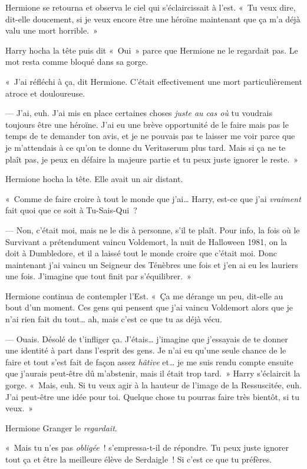 Hermione se retourna et observa le ciel qui s'éclaircissait à l'est. «~Tu veux dire, dit-elle doucement, si je veux encore être une héroïne maintenant que ça m'a déjà valu une mort horrible.~»

Harry hocha la tête puis dit «~Oui~» parce que Hermione ne le regardait pas. Le mot resta comme bloqué dans sa gorge.

«~J'ai réfléchi à ça, dit Hermione. C'était effectivement une mort particulièrement atroce et douloureuse.

--- J'ai, euh. J'ai mis en place certaines choses \emph{juste au cas où} tu voudrais toujours être une héroïne. J'ai eu une brève opportunité de le faire mais pas le temps de te demander ton avis, et je ne pouvais pas te laisser me voir parce que je m'attendais à ce qu'on te donne du Veritaserum plus tard. Mais si ça ne te plaît pas, je peux en défaire la majeure partie et tu peux juste ignorer le reste.~»

Hermione hocha la tête. Elle avait un air distant.

«~Comme de faire croire à tout le monde que j'ai… Harry, est-ce que j'ai \emph{vraiment} fait quoi que ce soit à Tu-Sais-Qui~?

--- Non, c'était moi, mais ne le dis à personne, s'il te plaît. Pour info, la fois où le Survivant a prétendument vaincu Voldemort, la nuit de Halloween 1981, on la doit à Dumbledore, et il a laissé tout le monde croire que c'était moi. Donc maintenant j'ai vaincu un Seigneur des Ténèbres une fois et j'en ai eu les lauriers une fois. J'imagine que tout finit par s'équilibrer.~»

Hermione continua de contempler l'Est. «~Ça me dérange un peu, dit-elle au bout d'un moment. Ces gens qui pensent que j'ai vaincu Voldemort alors que je n'ai rien fait du tout… ah, mais c'est ce que tu as déjà vécu.

--- Ouais. Désolé de t'infliger ça. J'étais… j'imagine que j'essayais de te donner une identité à part dans l'esprit des gens. Je n'ai eu qu'une seule chance de le faire et tout s'est fait de façon assez \emph{hâtive} et… je me suis rendu compte ensuite que j'aurais peut-être dû m'abstenir, mais il était trop tard.~» Harry s'éclaircit la gorge. «~Mais, euh. Si tu veux agir à la hauteur de l'image de la Ressuscitée, euh. J'ai peut-être une idée pour toi. Quelque chose tu pourras faire très bientôt, si tu veux.~»

Hermione Granger le \emph{regardait}.

«~Mais tu n'es pas \emph{obligée}~! s'empressa-t-il de répondre. Tu peux juste ignorer tout ça et être la meilleure élève de Serdaigle~! Si c'est ce que tu préfères.

